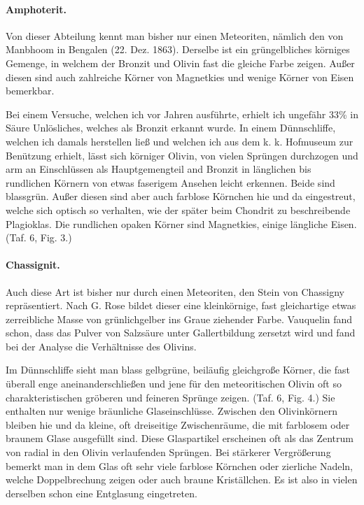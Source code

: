\documentclass[a4paper, 12pt, oneside]{article}
\begin{document}
\paragraph{Amphoterit.} Von dieser Abteilung kennt man bisher nur einen Meteoriten, nämlich den von Manbhoom in Bengalen (22. Dez. 1863). Derselbe ist ein grüngelbliches körniges Gemenge, in welchem der Bronzit und Olivin fast die gleiche Farbe zeigen. Außer diesen sind auch zahlreiche Körner von Magnetkies und wenige Körner von Eisen bemerkbar.

Bei einem Versuche, welchen ich vor Jahren ausführte, erhielt ich ungefähr 33\% in Säure Unlösliches, welches als Bronzit erkannt wurde. In einem Dünnschliffe, welchen ich damals herstellen ließ und welchen ich aus dem k. k. Hofmuseum zur Benützung erhielt, lässt sich körniger Olivin, von vielen Sprüngen durchzogen und arm an Einschlüssen als Hauptgemengteil and Bronzit in länglichen bis rundlichen Körnern von etwas faserigem Ansehen leicht erkennen. Beide sind blassgrün. Außer diesen sind aber auch farblose Körnchen hie und da eingestreut, welche sich optisch so verhalten, wie der später beim Chondrit zu beschreibende Plagioklas. Die rundlichen opaken Körner sind Magnetkies, einige längliche Eisen. (Taf. 6, Fig. 3.)

\paragraph{Chassignit.} Auch diese Art ist bisher nur durch einen Meteoriten, den Stein von Chassigny repräsentiert. Nach G. Rose bildet dieser eine kleinkörnige, fast gleichartige etwas zerreibliche Masse von grünlichgelber ins Graue ziehender Farbe. Vauquelin fand schon, dass das Pulver von Salzsäure unter Gallertbildung zersetzt wird und fand bei der Analyse die Verhältnisse des Olivins.

Im Dünnschliffe sieht man blass gelbgrüne, beiläufig gleichgroße Körner, die fast überall enge aneinanderschließen und jene für den meteoritischen Olivin oft so charakteristischen gröberen und feineren Sprünge zeigen. (Taf. 6, Fig. 4.) Sie enthalten nur wenige bräunliche Glaseinschlüsse. Zwischen den Olivinkörnern bleiben hie und da kleine, oft dreiseitige Zwischenräume, die mit farblosem oder braunem Glase ausgefüllt sind. Diese Glaspartikel erscheinen oft als das Zentrum von radial in den Olivin verlaufenden Sprüngen. Bei stärkerer Vergrößerung bemerkt man in dem Glas oft sehr viele farblose Körnchen oder zierliche Nadeln, welche Doppelbrechung zeigen oder auch braune Kriställchen. Es ist also in vielen derselben schon eine Entglasung eingetreten.
\end{document}
